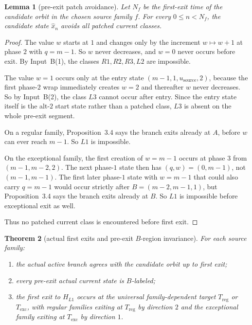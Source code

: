 \documentclass[11pt]{article}
\newtheorem{theorem}{Theorem}[section]
\newtheorem{lemma}[theorem]{Lemma}
\begin{document}
\begin{lemma}[pre-exit patch avoidance]
Let $N_f$ be the first-exit time of the candidate orbit in the chosen source
family $f$. For every $0\le n<N_f$, the candidate state $\widehat x_n$ avoids
all patched current classes.
\end{lemma}

\begin{proof}
The value $w$ starts at $1$ and changes only by the increment $w\mapsto w+1$ at
phase $2$ with $q=m-1$. So $w$ never decreases, and $w=0$ never occurs before
exit. By Input~B(1), the classes $R1,R2,R3,L2$ are impossible.

The value $w=1$ occurs only at the entry state $(m-1,1,u_{\mathrm{source}},2)$,
because the first phase-$2$ wrap immediately creates $w=2$ and thereafter $w$
never decreases. So by Input~B(2), the class $L3$ cannot occur after entry.
Since the entry state itself is the alt-$2$ start state rather than a patched
class, $L3$ is absent on the whole pre-exit segment.

On a regular family, Proposition~3.4 says the branch exits already at $A$,
before $w$ can ever reach $m-1$. So $L1$ is impossible.

On the exceptional family, the first creation of $w=m-1$ occurs at phase $3$
from $(m-1,m-2,2)$. The next phase-$1$ state then has $(q,w)=(0,m-1)$, not
$(m-1,m-1)$. The first later phase-$1$ state with $w=m-1$ that could also
carry $q=m-1$ would occur strictly after $B=(m-2,m-1,1)$, but
Proposition~3.4 says the branch exits already at $B$. So $L1$ is impossible
before exceptional exit as well.

Thus no patched current class is encountered before first exit.
\end{proof}

\begin{theorem}[actual first exits and pre-exit $B$-region invariance]
For each source family:
\begin{enumerate}[label=\textup{(\arabic*)},leftmargin=2.5em]
\item the actual active branch agrees with the candidate orbit up to first
      exit;
\item every pre-exit actual current state is $B$-labeled;
\item the first exit to $H_{L1}$ occurs at the universal family-dependent
      target $T_{\mathrm{reg}}$ or $T_{\mathrm{exc}}$, with regular families
      exiting at $T_{\mathrm{reg}}$ by direction $2$ and the exceptional family
      exiting at $T_{\mathrm{exc}}$ by direction $1$.
\end{enumerate}
\end{theorem}
\end{document}
